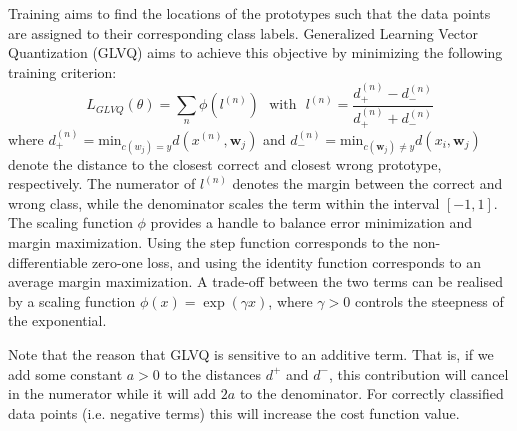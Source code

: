 \documentclass{esannV2}
\begin{document}
Training aims to find the locations of the prototypes such that the data points are assigned to their corresponding class labels. Generalized Learning Vector Quantization (GLVQ) \cite{sato1996generalized} aims to achieve this objective by minimizing the following training criterion:
\begin{equation}
 L_{GLVQ}(\theta) = \sum_n \phi(l^{(n)}) \mbox{~~with~~} l^{(n)} = \frac{d^{(n)}_+ - d^{(n)}_-}{d^{(n)}_+ + d^{(n)}_-}
\end{equation}
where $d^{(n)}_+ = \mbox{min}_{c(w_j) = y} d(x^{(n)}, \mathbf{w}_j)$ and $d^{(n)}_- = \mbox{min}_{c(\mathbf{w}_j)\neq y} d(x_i, \mathbf{w}_j)$ denote the distance to the closest correct and closest wrong prototype, respectively. The numerator of $l^{(n)}$ denotes the margin between the correct and wrong class, while the denominator scales the term within the interval $[-1, 1]$. The scaling function $\phi$ provides a handle to balance error minimization and margin maximization. Using the step function corresponds to the non-differentiable zero-one loss, and using the identity function corresponds to an average margin maximization. A trade-off between the two terms can be realised by a scaling function $\phi(x) = \exp(\gamma x)$, where $\gamma > 0$ controls the steepness of the exponential. 

Note that the reason that GLVQ is sensitive to an additive term. That is, if we add some constant $a > 0$ to the distances $d^+$ and $d^-$, this contribution will cancel in the numerator while it will add $2a$ to the denominator. For correctly classified data points (i.e. negative terms) this will increase the cost function value. 
\end{document}
